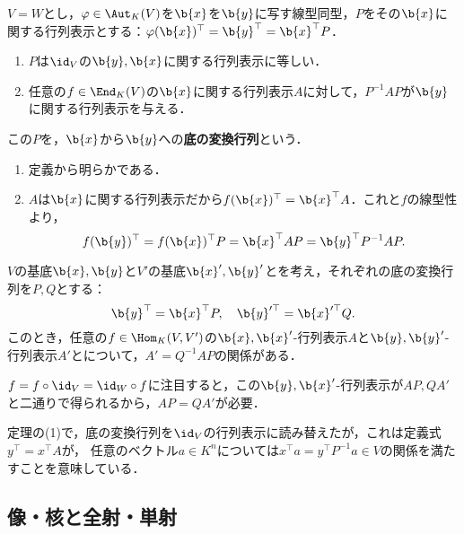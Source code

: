 \documentclass[uplatex, dvipdfmx]{jsreport}
\begin{document}
\begin{theorem}[正方行列表示の変換]
    $V=W$とし，$\varphi\in\Aut_K(V)$を$\b{x}$を$\b{y}$に写す線型同型，$P$をその$\b{x}$に関する行列表示とする：$\varphi(\b{x})^\top=\b{y}^\top=\b{x}^\top P$．
    \begin{enumerate}
        \item $P$は$\id_V$の$\b{y},\b{x}$に関する行列表示に等しい．
        \item 任意の$f\in\End_K(V)$の$\b{x}$に関する行列表示$A$に対して，$P^{-1}AP$が$\b{y}$に関する行列表示を与える．
    \end{enumerate}
    この$P$を，$\b{x}$から$\b{y}$への\textbf{底の変換行列}という．
\end{theorem}
\begin{Proof}\mbox{}
    \begin{enumerate}
        \item 定義から明らかである．
        \item $A$は$\b{x}$に関する行列表示だから$f(\b{x})^\top=\b{x}^\top A$．これと$f$の線型性より，
        \[f(\b{y})^\top=f(\b{x})^\top P=\b{x}^\top AP=\b{y}^\top P^{-1}AP.\]
    \end{enumerate}
\end{Proof}

\begin{corollary}[一般の行列表示の変換]
    $V$の基底$\b{x},\b{y}$と$V'$の基底$\b{x}',\b{y}'$とを考え，それぞれの底の変換行列を$P,Q$とする：
    \[\b{y}^\top=\b{x}^\top P,\quad \b{y}'^\top=\b{x}'^\top Q.\]
    このとき，任意の$f\in\Hom_K(V,V')$の$\b{x},\b{x}'$-行列表示$A$と$\b{y},\b{y}'$-行列表示$A'$とについて，$A'=Q^{-1}AP$の関係がある．
\end{corollary}
\begin{Proof}
    $f=f\circ\id_V=\id_W\circ f$に注目すると，この$\b{y},\b{x}'$-行列表示が$AP,QA'$と二通りで得られるから，$AP=QA'$が必要．
\end{Proof}
\begin{remarks}[基底の変換行列は係数ベクトルには反変に作用する]
    定理の(1)で，底の変換行列を$\id_V$の行列表示に読み替えたが，これは定義式$y^\top=x^\top A$が，
    任意のベクトル$a\in K^n$については$x^\top a=y^\top P^{-1}a\in V$の関係を満たすことを意味している．
\end{remarks}

\subsection{像・核と全射・単射}
\end{document}
